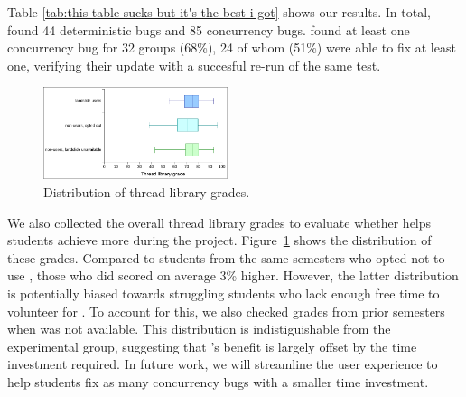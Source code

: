 Table \ref{tab:this-table-sucks-but-it's-the-best-i-got} shows our results.
In total, \landslide found 44 deterministic bugs and 85 concurrency bugs.
\landslide found at least one concurrency bug for 32 groups (68\%),
24 of whom (51\%) were able to fix at least one,
verifying their update with a succesful re-run of the same test.

\begin{figure}[t]
	\includegraphics[width=0.48\textwidth]{p2-distribution-large.pdf}
	\caption{Distribution of thread library grades.}
	\label{fig:p2-distribution}
\end{figure}
We also collected the overall thread library grades to evaluate whether \landslide helps students achieve more during the project.
Figure~\ref{fig:p2-distribution} shows the distribution of these grades.
Compared to students from the same semesters who opted not to use \landslide,
those who did scored on average 3\% higher. %
%
However, the latter distribution is potentially biased towards struggling students
who lack enough free time to volunteer for \landslide.
To account for this, we also checked grades from prior semesters when \landslide was not available.
This distribution is indistiguishable from the experimental group,
suggesting that \landslide's benefit is largely offset by the time investment required.
%
In future work, we will streamline the user experience to help students fix as many concurrency bugs with a smaller time investment.
